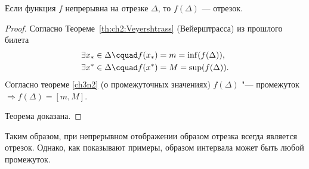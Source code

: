 \begin{thm}
Если функция $f$ непрерывна на отрезке $\Delta$, то $f(\Delta)$ — отрезок.
\end{thm}
\begin{proof}
Согласно Теореме~\ref{th:ch2:Veyershtrass} (Вейерштрасса) из прошлого билета 
\begin{align*}
&\exists x_* \in \Delta\cquad f(x_*)=m=\inf(f(\Delta)),\\
&\exists x^* \in \Delta\cquad f(x^*)=M=\sup(f(\Delta)).
\end{align*}   
Cогласно теореме \ref{ch3n2} (о промежуточных значениях) $f(\Delta)$ "--- промежуток $\Rightarrow f(\Delta)=[m,M]$. 

Теорема доказана.
\end{proof} 

Таким образом, при непрерывном отображении образом отрезка всегда является отрезок. Однако, как показывают примеры, образом интервала может быть любой промежуток.